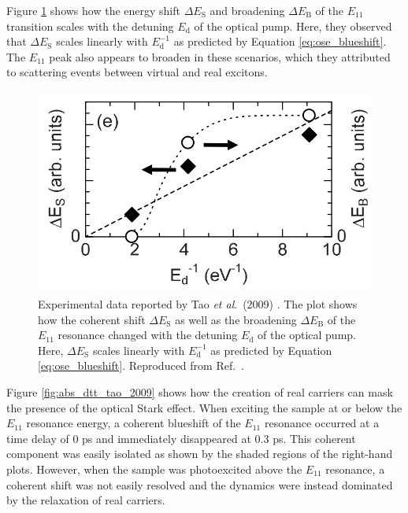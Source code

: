 Figure \ref{fig:detuning_tao_2009} shows how the energy shift $\Delta E_\text{S}$ and broadening $\Delta E_\text{B}$ of the $E_{11}$ transition scales with the detuning $E_\text{d}$ of the optical pump. Here, they observed that $\Delta E_\text{S}$ scales linearly with $E_\text{d}^{-1}$ as predicted by Equation \eqref{eq:ose_blueshift}. The $E_{11}$ peak also appears to broaden in these scenarios, which they attributed to scattering events between virtual and real excitons.

\begin{figure}[ht]
	\centering
	\includegraphics[scale=0.35]{images/chapter_prior_works/fluence_tao_2009}
	\caption{Experimental data reported by Tao \textit{et al}.\ (2009) \cite{tao2009subpicosecond}. The plot shows how the coherent shift $\Delta E_\text{S}$ as well as the broadening $\Delta E_\text{B}$ of the $E_{11}$ resonance changed with the detuning $E_\text{d}$ of the optical pump. Here, $\Delta E_\text{S}$ scales linearly with $E_\text{d}^{-1}$ as predicted by Equation \eqref{eq:ose_blueshift}. Reproduced from Ref.\ \cite{tao2009subpicosecond}.}
	\label{fig:detuning_tao_2009}
\end{figure}

Figure \ref{fig:abs_dtt_tao_2009} shows how the creation of real carriers can mask the presence of the optical Stark effect. When exciting the sample at or below the $E_{11}$ resonance energy, a coherent blueshift of the $E_{11}$ resonance occurred at a time delay of 0 ps and immediately disappeared at 0.3 ps. This coherent component was easily isolated as shown by the shaded regions of the right-hand plots. However, when the sample was photoexcited above the $E_{11}$ resonance, a coherent shift was not easily resolved and the dynamics were instead dominated by the relaxation of real carriers.

